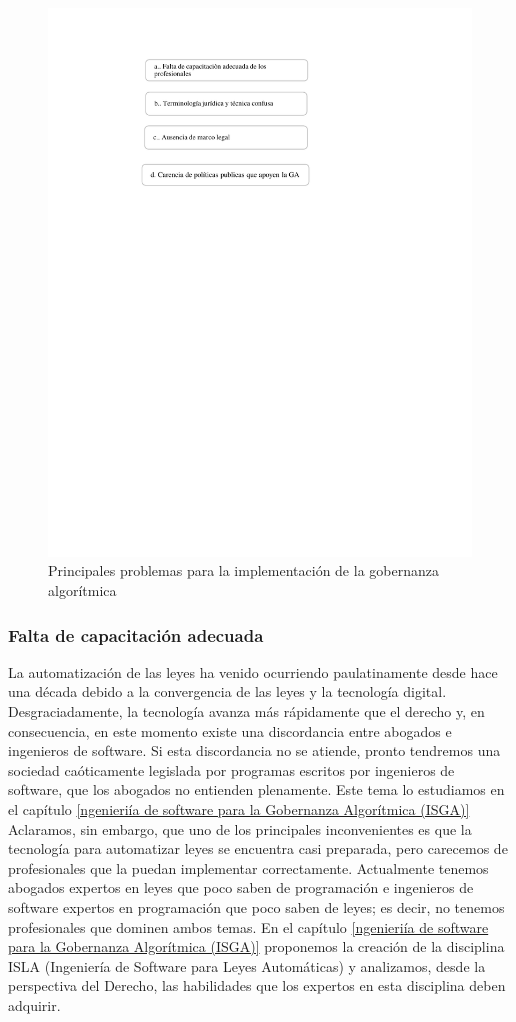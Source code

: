 \documentclass[12pt]{report} %
\begin{document}
\begin{figure}
\centering
\includegraphics[width=0.85\columnwidth]{imagenes/barrashorizontales.pdf}
\caption{Principales problemas para la implementación de la gobernanza algorítmica}
\label{barrashorizontales}
\end{figure} 


\subsubsection{Falta de capacitación adecuada}

La automatización de las leyes ha venido ocurriendo paulatinamente desde hace una década debido a la convergencia de las leyes y la tecnología digital. Desgraciadamente, la tecnología avanza más rápidamente que el derecho y, en consecuencia, en este momento existe una discordancia entre abogados e ingenieros de software. Si esta discordancia no se atiende, pronto tendremos una sociedad caóticamente legislada por programas escritos por ingenieros de software, que los abogados no entienden plenamente. Este tema lo estudiamos en el capítulo \ref{ngenieriía de software para la Gobernanza Algorítmica (ISGA)} Aclaramos, sin embargo, que uno de los principales inconvenientes es que la tecnología para automatizar leyes se encuentra casi preparada, pero carecemos de profesionales que la puedan implementar correctamente. Actualmente tenemos abogados expertos en leyes que poco saben de programación e ingenieros de software expertos en programación que poco saben de leyes; es decir, no tenemos profesionales que dominen ambos temas. En el capítulo \ref{ngenieriía de software para la Gobernanza Algorítmica (ISGA)} proponemos la creación de la disciplina ISLA (Ingeniería de Software para Leyes Automáticas) y analizamos, desde la perspectiva del Derecho, las habilidades que los expertos en esta disciplina deben adquirir.
\end{document}
